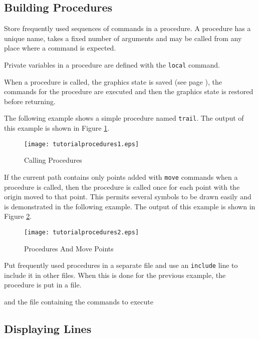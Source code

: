 \subsection{Building Procedures}

Store frequently used sequences of commands in a procedure.
A procedure has a unique name, takes a fixed number of arguments and
may be called from any place where a command is expected.

Private variables in a procedure are defined with the 
\texttt{local} command.

When a procedure is called, the graphics state
is saved (see page \pageref{graphicsstate}),
the commands for the procedure are executed and then the
graphics state is restored before returning.

The following example shows a simple procedure named \texttt{trail}.
The output of this example is shown in Figure \ref{tutorialprocedures1}.



\begin{figure}[htb]
\texttt{[image: tutorialprocedures1.eps]}
\caption{Calling Procedures}
\label{tutorialprocedures1}
\end{figure}

If the current path contains only points added with \texttt{move}
commands when a procedure is called, then the
procedure is called once for each point with the origin
moved to that point.  This permits several symbols to be drawn
easily and is demonstrated in the following example.  The 
output of this example is shown in Figure \ref{tutorialprocedures2}.



\begin{figure}[htb]
\texttt{[image: tutorialprocedures2.eps]}
\caption{Procedures And Move Points}
\label{tutorialprocedures2}
\end{figure}


Put frequently used procedures in a separate file and use an
\texttt{include}
line to include it in other files.  When this is done for the
previous example, the procedure is put in a file.



and the file containing the commands to execute



\subsection{Displaying Lines}

